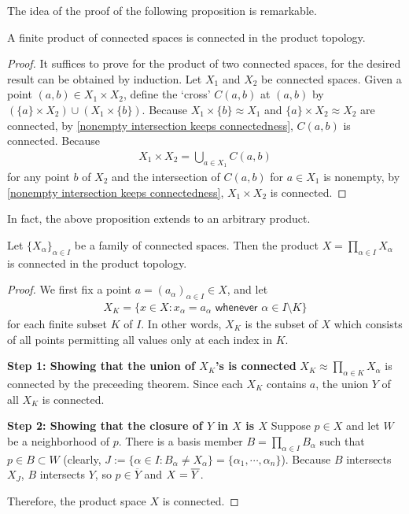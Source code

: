 The idea of the proof of the following proposition is remarkable.
\begin{thm}
    A finite product of connected spaces is connected in the product topology.
\end{thm}
\begin{proof}
    It suffices to prove for the product of two connected spaces, for the desired result can be obtained by induction.
    Let $X_1$ and $X_2$ be connected spaces.
    Given a point $(a, b)\in X_1\times X_2$, define the `cross' $C(a, b)$ at $(a, b)$ by $(\{a\}\times X_2)\cup(X_1\times\{b\})$.
    Because $X_1\times\{b\}\approx X_1$ and $\{a\}\times X_2\approx X_2$ are connected, by \cref{nonempty intersection keeps connectedness}, $C(a, b)$ is connected.
    Because
    \begin{align*}
        X_1\times X_2=\bigcup_{a\in X_1}C(a, b)
    \end{align*}
    for any point $b$ of $X_2$ and the intersection of $C(a, b)$ for $a\in X_1$ is nonempty, by \cref{nonempty intersection keeps connectedness}, $X_1\times X_2$ is connected.
\end{proof}

In fact, the above proposition extends to an arbitrary product.
\begin{thm}
    Let $\{X_\alpha\}_{\alpha\in I}$ be a family of connected spaces.
    Then the product $X=\prod_{\alpha\in I}X_\alpha$ is connected in the product topology.
\end{thm}
\begin{proof}
    We first fix a point $a=(a_\alpha)_{\alpha\in I}\in X$, and let
    \begin{align*}
        X_K=\{x\in X
        :
        x_\alpha=a_\alpha\textsf{ whenever }\alpha\in I\setminus K
        \}
    \end{align*}
    for each finite subset $K$ of $I$.
    In other words, $X_K$ is the subset of $X$ which consists of all points permitting all values only at each index in $K$.

    \noindent\textbf{Step 1: Showing that the union of $X_K$'s is connected}\newline\indent
    $X_K\approx\prod_{\alpha\in K}X_\alpha$ is connected by the preceeding theorem.
    Since each $X_K$ contains $a$, the union $Y$ of all $X_K$ is connected.

    \noindent\textbf{Step 2: Showing that the closure of $Y$ in $X$ is $X$}\newline\indent
    Suppose $p\in X$ and let $W$ be a neighborhood of $p$.
    There is a basis member $B=\prod_{\alpha\in I} B_\alpha$ such that $p\in B\subset W$ (clearly, $J:=\{\alpha\in I: B_\alpha\neq X_\alpha\}=\{\alpha_1, \cdots, \alpha_n\}$).
    Because $B$ intersects $X_J$, $B$ intersects $Y$, so $p\in\overline{Y}$ and $X=\overline{Y}$.

    Therefore, the product space $X$ is connected.
\end{proof}


